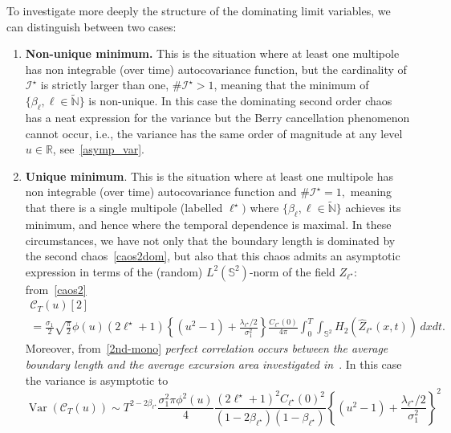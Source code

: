 \documentclass[AHL,Unicode,longabstracts,published]{cedram}
\newcommand{\clI}{\mathcal{I}}
\newcommand{\clC}{\mathcal{C}}
\newcommand{\bbS}{\mathbb{S}}
\newcommand{\bbR}{\mathbb{R}}
\newcommand{\bbN}{\mathbb{N}}
\DeclareMathOperator{\Var}{Var}
\begin{document}
To investigate more deeply the structure of the dominating limit variables, we can distinguish between two cases:
\begin{enumerate}
\item \textbf{Non-unique minimum.} This is the situation where at least one multipole has non integrable (over time) autocovariance function, but the cardinality of $\clI^{\star }$ is strictly larger than one, $\#\clI^{\star }>1$, meaning that the minimum of $\{\beta _{\ell }, \ell\in \widetilde{\bbN} \}$ is non-unique. In this case the dominating second order chaos has a neat expression for the variance but the Berry cancellation phenomenon cannot occur, i.e., the variance has the same order of magnitude at any level $u\in\bbR$, see~\eqref{asymp_var}.
\item \textbf{Unique minimum}. This is the situation where at least one multipole has non integrable (over time) autocovariance function and $\#
\clI^{\star }=1,$ meaning that there is a single multipole (labelled $
\ell ^{\star })$ where $\{\beta _{\ell }, \ell\in \widetilde{\bbN }\}$ achieves its minimum, and hence where the temporal dependence is maximal. In these circumstances, we have not only that the boundary length is dominated by the second chaos~\eqref{caos2dom}, but also that this chaos admits an asymptotic expression in terms of the (random) $L^{2}(\bbS ^2) $-norm of the field $Z_{\ell^{\star}}$: from~\eqref{caos2}
\begin{multline}\label{2nd-mono}
\clC_T(u)[2]\\
=\frac{\sigma _{1}}{2}\sqrt{\frac{\pi }{2}}\phi (u)\left(2\ell^{\star }+1\right)\left\{\left(u^{2}-1\right)+\frac{\lambda _{\ell^{\star }}/2}{\sigma _{1}^{2}}\right\} \frac{C_{\ell^\star}(0)}{4\pi} \int_0^T\int_{\bbS ^{2}}H_{2}\left(\widehat Z_{\ell^\star}(x,t)\right)\,dxdt.
\end{multline}
Moreover, from~\eqref{2nd-mono} \emph{perfect correlation occurs between the average boundary length and the average excursion area investigated in~\cite {MRV:20}}. In this case the variance is asymptotic to
\begin{equation}\label{Berry}
\Var\left(\clC_{T}(u)\right)\sim{T^{2-2\beta_{\ell^\star}}}\frac{\sigma_{1}^{2}\pi \phi^{2}(u)}{4} \frac{\left(2\ell^\star+1\right)^{2} C_{\ell^\star}(0)^2}{\left(1-2\beta_{\ell^\star}\right)\left(1-\beta_{\ell^\star}\right)} \left\{\left(u^{2}-1\right)+\frac{\lambda_{\ell^\star}/2}{\sigma_{1}^{2}}\right\}^2 
\end{equation}
\end{enumerate}
\end{document}
